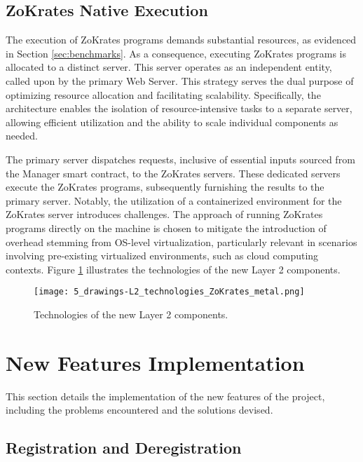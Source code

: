 \subsection{ZoKrates Native Execution}
The execution of ZoKrates programs demands substantial resources, as evidenced in Section \ref{sec:benchmarks}. As a consequence, executing ZoKrates programs is allocated to a distinct server. This server operates as an independent entity, called upon by the primary Web Server. This strategy serves the dual purpose of optimizing resource allocation and facilitating scalability. Specifically, the architecture enables the isolation of resource-intensive tasks to a separate server, allowing efficient utilization and the ability to scale individual components as needed.

The primary server dispatches requests, inclusive of essential inputs sourced from the Manager smart contract, to the ZoKrates servers. These dedicated servers execute the ZoKrates programs, subsequently furnishing the results to the primary server. Notably, the utilization of a containerized environment for the ZoKrates server introduces challenges. The approach of running ZoKrates programs directly on the machine is chosen to mitigate the introduction of overhead stemming from OS-level virtualization, particularly relevant in scenarios involving pre-existing virtualized environments, such as cloud computing contexts. Figure \ref{fig:5_drawings-L2_technologies_ZoKrates_metal} illustrates the technologies of the new Layer 2 components.

\begin{figure}[ht]
	\centering
	\texttt{[image: 5\_drawings-L2\_technologies\_ZoKrates\_metal.png]}
	\caption[Scaling Solutions]{Technologies of the new Layer 2 components.}  
	\label{fig:5_drawings-L2_technologies_ZoKrates_metal}
  \end{figure} 


\section{New Features Implementation}
This section details the implementation of the new features of the project, including the problems encountered and the solutions devised.

\subsection{Registration and Deregistration}


